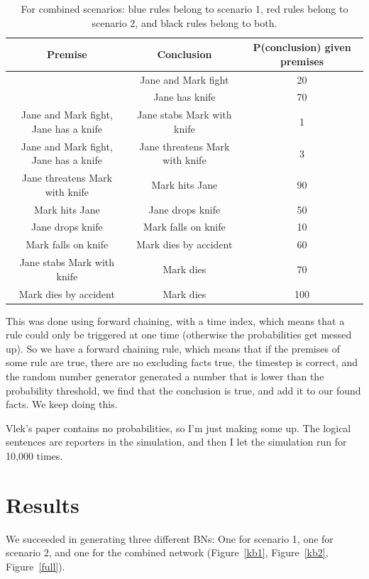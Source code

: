 \begin{table}
\begin{tabular}{|c|c|c|}
 \hline
 Premise & Conclusion & P(conclusion) given premises\\
 \hline
  & Jane and Mark fight   & 20   \\
  & Jane has knife & 70 \\
  \color{blue}Jane and Mark fight, Jane has a knife & Jane stabs Mark with knife & 1 \\
 \color{red}Jane and Mark fight, Jane has a knife & Jane threatens Mark with knife & 3 \\
  \color{red}Jane threatens Mark with knife & Mark hits Jane & 90 \\
  \color{red}Mark hits Jane & Jane drops knife & 50  \\
  \color{red}Jane drops knife & Mark falls on knife & 10 \\
  \color{red} Mark falls on knife & Mark dies by accident & 60  \\
  \color{blue}Jane stabs Mark with knife & Mark dies  & 70 \\ 
  \color{red}Mark dies by accident & Mark dies & 100  \\ 
\hline
\end{tabular}
\caption{For combined scenarios: blue rules belong to scenario 1, red rules belong to scenario 2, and black rules belong to both.}
\end{table}

This was done using forward chaining, with a time index, which means that a rule could only be triggered at one time (otherwise the probabilities get messed up). So we have a forward chaining rule, which means that if the premises of some rule are true, there are no excluding facts true, the timestep is correct, and the random number generator generated a number that is lower than the probability threshold, we find that the conclusion is true, and add it to our found facts. We keep doing this.

Vlek's paper contains no probabilities, so I'm just making some up. The logical sentences are reporters in the simulation, and then I let the simulation run for 10,000 times. 

\section{Results}
We succeeded in generating three different BNs:  One for scenario 1, one for scenario 2, and one for the combined network (Figure~\ref{kb1}, Figure~\ref{kb2}, Figure~\ref{full}).


